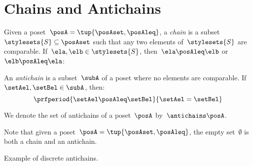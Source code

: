 
\section{Chains and Antichains}
\label{sec:chains-antichains}
\begin{definition}
    \label{def:chain}
    Given a poset~$\posA = \tup{\posAset, \posAleq}$, a \emph{chain} is a subset~$\stylesets{S} \subseteq \posAset$ such that any two elements of~$\stylesets{S}$ are comparable.
    If~$\ela, \elb \in \stylesets{S}$, then~$\ela \posAleq \elb$ or~$\elb \posAleq \ela$:
\end{definition}

\begin{definition}
    \label{def:antichain}
    An \emph{antichain} is a subset~$\subA$ of a poset where no elements are comparable.
    If~$\setAel,\setBel \in \subA$, then:
    \begin{equation}
        \prfperiod{
            \setAel \posAleq \setBel
        }{
            \setAel = \setBel
        }
    \end{equation}
\end{definition}

We denote the set of antichains of a poset~$\posA$ by~$\antichains\posA$.

\begin{remark}
    Note that given a poset~$\posA=\tup{\posAset,\posAleq}$, the empty set~$\emptyset$ is both a chain and an antichain.
\end{remark}

\begin{marginfigure}
    \centering
    \caption{Example of discrete antichains.}
    \label{fig:antichain}
\end{marginfigure}

